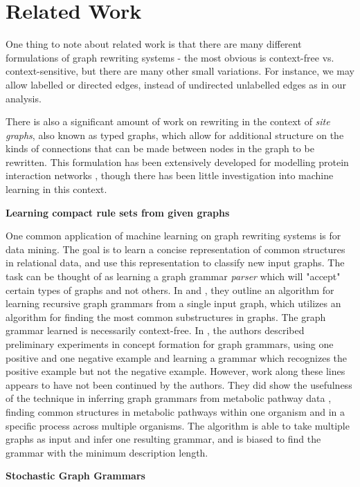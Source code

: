 \documentclass[]{article}
\begin{document}
\section{Related Work}

One thing to note about related work is that there are many different
formulations of graph rewriting systems - the most obvious is context-free vs.
context-sensitive, but there are many other small variations. For instance, we
may allow labelled or directed edges, instead of undirected unlabelled edges as
in our analysis.

There is also a significant amount of work on rewriting in the context of
\emph{site graphs}, also known as typed graphs, which allow for additional
structure on the kinds of connections that can be made between nodes in the
graph to be rewritten. This formulation has been extensively developed for
modelling protein interaction networks \cite{danos2012graphs}, though there has
been little investigation into machine learning in this context.

\textbf{Learning compact rule sets from given graphs}

One common application of machine learning on graph rewriting systems is for
data mining. The goal is to learn a concise representation of common structures
in relational data, and use this representation to classify new input graphs.
The task can be thought of as learning a graph grammar \emph{parser} which will
"accept" certain types of graphs and not others. In \cite{jonyer2002concept} and
\cite{jonyer2004mdl}, they outline an algorithm for learning recursive graph
grammars from a single input graph, which utilizes an algorithm for finding the
most common substructures in graphs. The graph grammar learned is necessarily
context-free. In \cite{jonyer2004mdl}, the authors described preliminary
experiments in concept formation for graph grammars, using one positive and one
negative example and learning a grammar which recognizes the positive example
but not the negative example. However, work along these lines appears to have
not been continued by the authors. They did show the usefulness of the technique
in inferring graph grammars from metabolic pathway data
\cite{kukluk2007learning}, finding common structures in metabolic pathways
within one organism and in a specific process across multiple organisms. The
algorithm is able to take multiple graphs as input and infer one resulting
grammar, and is biased to find the grammar with the minimum description length.

\textbf{Stochastic Graph Grammars}
\end{document}
